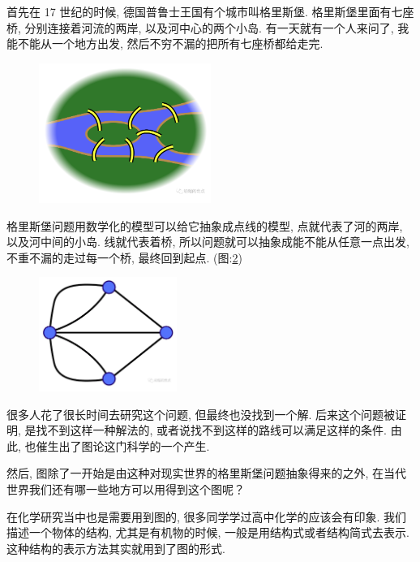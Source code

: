 首先在 17 世纪的时候, 德国普鲁士王国有个城市叫格里斯堡. 格里斯堡里面有七座桥, 分别连接着河流的两岸, 以及河中心的两个小岛. 有一天就有一个人来问了, 我能不能从一个地方出发, 然后不穷不漏的把所有七座桥都给走完. 

\begin{figure}[ht]
  \centering
  \includegraphics[width=0.5\textwidth]{asset/20231227144751.png}
  \caption{}
  \label{fig:img24_1}
\end{figure}

格里斯堡问题用数学化的模型可以给它抽象成点线的模型, 点就代表了河的两岸, 以及河中间的小岛. 线就代表着桥, 所以问题就可以抽象成能不能从任意一点出发, 不重不漏的走过每一个桥, 最终回到起点. (图:\ref{fig:img24_2})

\begin{figure}[ht]
  \centering
  \includegraphics[width=0.4\textwidth]{asset/20231227144732.png}
  \caption{}
  \label{fig:img24_2}
\end{figure}

很多人花了很长时间去研究这个问题, 但最终也没找到一个解. 后来这个问题被证明, 是找不到这样一种解法的, 或者说找不到这样的路线可以满足这样的条件. 由此, 也催生出了图论这门科学的一个产生. 

然后, 图除了一开始是由这种对现实世界的格里斯堡问题抽象得来的之外, 在当代世界我们还有哪一些地方可以用得到这个图呢？

在化学研究当中也是需要用到图的, 很多同学学过高中化学的应该会有印象. 我们描述一个物体的结构, 尤其是有机物的时候, 一般是用结构式或者结构简式去表示. 这种结构的表示方法其实就用到了图的形式. 

